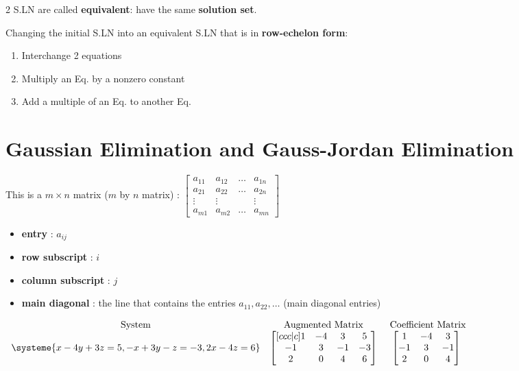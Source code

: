 \documentclass{article}
\begin{document}
    2 S.LN are called \textbf{equivalent}: have the same \textbf{solution set}.

    Changing the initial S.LN into an equivalent S.LN that is in  \textbf{row-echelon form}:
    \begin{enumerate}
        \item Interchange 2 equations
        \item Multiply an Eq. by a nonzero constant
        \item Add a multiple of an Eq. to another Eq.
    \end{enumerate}


    \section{Gaussian Elimination and Gauss-Jordan Elimination}
        
    This is a $m \times n$ matrix ($m$ by $n$ matrix) : 
    $\begin{bmatrix}
        a_{11} & a_{12} & \dots & a_{1n} \\
        a_{21} & a_{22} & \dots & a_{2n} \\
        \vdots & \vdots & & \vdots \\
        a_{m1} & a_{m2} & \dots & a_{mn}
    \end{bmatrix}$
    \begin{itemize}
        \item \textbf{entry} : $a_{ij}$
        \item \textbf{row subscript} : $i$
        \item \textbf{column subscript} : $j$
        \item \textbf{main diagonal} : the line that contains the entries $a_{11}, a_{22}, \dots$ (main diagonal entries)
    \end{itemize}
    
    $\begin{array}{ccc}
        \text{System} & \text{Augmented Matrix} & \text{ Coefficient Matrix} \\
        \systeme {
            x - 4y + 3z = 5,
            -x + 3y - z = -3,
            2x - 4z = 6
        }
        & \begin{bmatrix}[ccc|c]
            1  & -4 & 3 & 5\\
            -1 & 3 & -1 & -3\\
            2 & 0 & 4 & 6
        \end{bmatrix}
        & \begin{bmatrix}
            1 & -4 & 3\\
            -1 & 3 & -1\\
            2 & 0 & 4
        \end{bmatrix}
    \end{array}$
\end{document}
